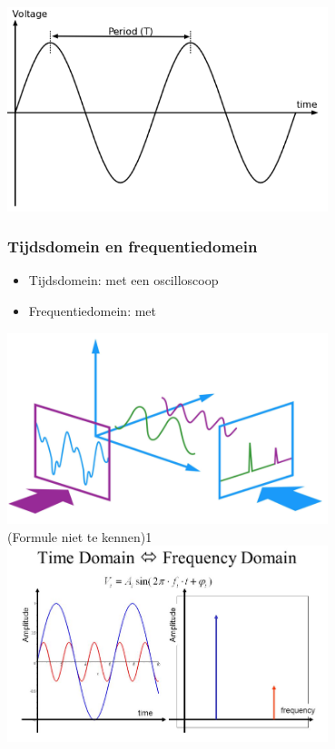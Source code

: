 \documentclass{article}
\begin{document}
\includegraphics[width=0.7\textwidth]{Screenshot_20200217_122002.png}

\subsubsection{Tijdsdomein en frequentiedomein}
\begin{itemize}
    \item Tijdsdomein: met een oscilloscoop
    \item Frequentiedomein: met 
\end{itemize}

\includegraphics[width=0.7\textwidth]{Screenshot_20200217_122108.png}
\\
(Formule niet te kennen)1
\\
\includegraphics[width=0.7\textwidth]{Screenshot_20200217_122246.png}
\end{document}

